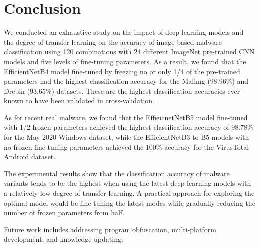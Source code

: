 \documentclass[conference]{IEEEtran}
\begin{document}
\section{Conclusion}
\label{sec:conclusion}

We conducted an exhaustive study on the impact of deep learning models and the degree of transfer learning on the accuracy of image-based malware classification using 120 combinations with 24 different ImageNet pre-trained CNN models and five levels of fine-tuning parameters.
As a result, we found that the EfficientNetB4 model fine-tuned by freezing no or only 1/4 of the pre-trained parameters had the highest classification accuracy for the Malimg (98.96\%) and Drebin (93.65\%) datasets.
These are the highest classification accuracies ever known to have been validated in cross-validation. 

As for recent real malware, we found that the EffieicnetNetB5 model fine-tuned with 1/2 frozen parameters achieved the highest classification accuracy of 98.78\% for the May 2020 Windows dataset, while the EfficientNetB3 to B5 models with no frozen fine-tuning parameters achieved the 100\% accuracy for the VirusTotal Android dataset.

The experimental results show that the classification accuracy of malware variants tends to be the highest when using the latest deep learning models with a relatively low degree of transfer learning.
A practical approach for exploring the optimal model would be fine-tuning the latest modes while gradually reducing the number of frozen parameters from half.

Future work includes addressing program obfuscation, multi-platform development, and knowledge updating.



\end{document}
